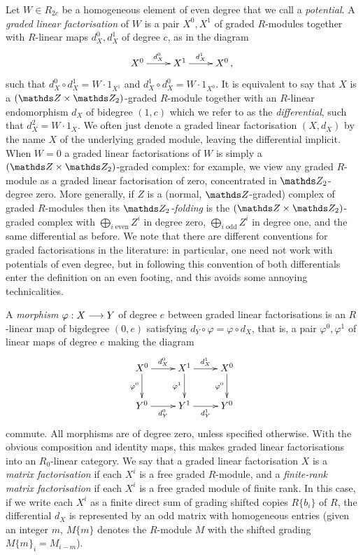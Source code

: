 \documentclass{compositio}
\theoremstyle{definition}
\numberwithin{equation}{section}
\begin{document}
Let $W \in R_{2c}$ be a homogeneous element of even degree that we call a \emph{potential}. A \emph{graded linear factorisation} of $W$ is a pair $X^0, X^1$ of graded $R$-modules together with $R$-linear maps $d_X^0, d_X^1$ of degree $c$, as in the diagram
\[
\xymatrix{
X^0 \ar[r]^-{d_X^0} & X^1 \ar[r]^-{d_X^1} & X^0\,,
}
\]
such that $d_X^0 \circ d_X^1 = W \cdot 1_{X^1}$ and $d_X^1 \circ d_X^0  = W \cdot 1_{X^0}$. It is equivalent to say that $X$ is a $(\ZZ \times \Ztwo)$-graded $R$-module together with an $R$-linear endomorphism $d_X$ of bidegree $(1,c)$ which we refer to as the \emph{differential}, such that $d_X^2 = W \cdot 1_X$. We often just denote a graded linear factorisation $(X,d_X)$ by the name $X$ of the underlying graded module, leaving the differential implicit. When $W = 0$ a graded linear factorisations of $W$ is simply a $(\ZZ \times \Ztwo)$-graded complex: for example, we view any graded $R$-module as a graded linear factorisation of zero, concentrated in $\nZ_{2}$-degree zero. More generally, if $Z$ is a (normal, $\ZZ$-graded) complex of graded $R$-modules then its \emph{$\Ztwo$-folding} is the $(\ZZ \times \Ztwo)$-graded complex with $\bigoplus_{i\;\text{even}} Z^i$ in degree zero, $\bigoplus_{i\;\text{odd}} Z^i$ in degree one, and the same differential as before. We note that there are different conventions for graded factorisations in the literature: in particular, one need not work with potentials of even degree, but in following this convention of \cite{kr0401268} both differentials enter the definition on an even footing, and this avoids some annoying technicalities.

A \emph{morphism} $\varphi: X \longrightarrow Y$ of degree $e$ between graded linear factorisations is an $R$-linear map of bigdegree $(0, e)$ satisfying $d_Y \circ \varphi = \varphi \circ d_X$, that is, a pair $\varphi^0, \varphi^1$ of linear maps of degree $e$ making the diagram
\[
\xymatrix{
X^0 \ar[d]_-{\varphi^0} \ar[r]^-{d_X^0} & X^1 \ar[d]_-{\varphi^1} \ar[r]^-{d_X^1} & X^0 \ar[d]_-{\varphi^0}\\
Y^0 \ar[r]_-{d_Y^0} & Y^1 \ar[r]_-{d_Y^1} & Y^0
}
\] 
commute. All morphisms are of degree zero, unless specified otherwise. With the obvious composition and identity maps, this makes graded linear factorisations into an $R_0$-linear category. We say that a graded linear factorisation $X$ is a \emph{matrix factorisation} if each $X^i$ is a free graded $R$-module, and a \emph{finite-rank matrix factorisation} if each $X^i$ is a free graded module of finite rank. In this case, if we write each $X^i$ as a finite direct sum of grading shifted copies $R\{ b_i \}$ of $R$, the differential $d_X$ is represented by an odd matrix with homogeneous entries (given an integer $m$, $M\{ m \}$ denotes the $R$-module $M$ with the shifted grading $M\{ m \}_i = M_{i - m}$).
\end{document}

